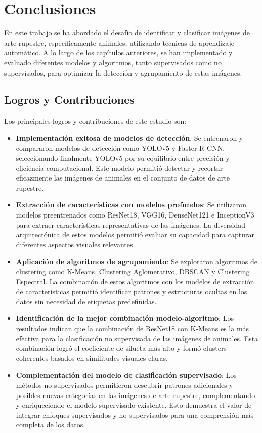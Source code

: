 \chapter{Conclusiones}

En este trabajo se ha abordado el desafío de identificar y clasificar imágenes de arte rupestre, específicamente animales, utilizando técnicas de aprendizaje automático. A lo largo de los capítulos anteriores, se han implementado y evaluado diferentes modelos y algoritmos, tanto supervisados como no supervisados, para optimizar la detección y agrupamiento de estas imágenes.

\section{Logros y Contribuciones}

Los principales logros y contribuciones de este estudio son:

\begin{itemize}
    \item \textbf{Implementación exitosa de modelos de detección}: Se entrenaron y compararon modelos de detección como YOLOv5 y Faster R-CNN, seleccionando finalmente YOLOv5 por su equilibrio entre precisión y eficiencia computacional. Este modelo permitió detectar y recortar eficazmente las imágenes de animales en el conjunto de datos de arte rupestre.
    \item \textbf{Extracción de características con modelos profundos}: Se utilizaron modelos preentrenados como ResNet18, VGG16, DenseNet121 e InceptionV3 para extraer características representativas de las imágenes. La diversidad arquitectónica de estos modelos permitió evaluar su capacidad para capturar diferentes aspectos visuales relevantes.
    \item \textbf{Aplicación de algoritmos de agrupamiento}: Se exploraron algoritmos de clustering como K-Means, Clustering Aglomerativo, DBSCAN y Clustering Espectral. La combinación de estos algoritmos con los modelos de extracción de características permitió identificar patrones y estructuras ocultas en los datos sin necesidad de etiquetas predefinidas.
    \item \textbf{Identificación de la mejor combinación modelo-algoritmo}: Los resultados indican que la combinación de ResNet18 con K-Means es la más efectiva para la clasificación no supervisada de las imágenes de animales. Esta combinación logró el coeficiente de silueta más alto y formó clusters coherentes basados en similitudes visuales claras.
    \item \textbf{Complementación del modelo de clasificación supervisado}: Los métodos no supervisados permitieron descubrir patrones adicionales y posibles nuevas categorías en las imágenes de arte rupestre, complementando y enriqueciendo el modelo supervisado existente. Esto demuestra el valor de integrar enfoques supervisados y no supervisados para una comprensión más completa de los datos.
\end{itemize}


